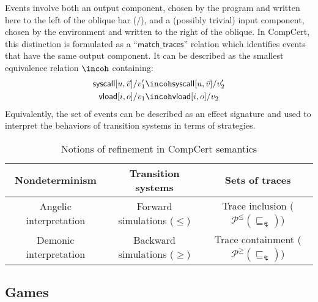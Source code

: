 \documentclass[sigplan,10pt,review,anonymous]{acmart}
\newcommand{\kw}[1]{\ensuremath{ \mathsf{#1} }}
\newcommand{\refby}{\sqsubseteq}
\begin{document}
Events involve both an output component,
chosen by the program and
written here to the left of the oblique bar ($/$),
and a (possibly trivial) input component,
chosen by the environment and written to the right of the oblique.
In CompCert,
this distinction is formulated as a ``$\kw{match\_traces}$'' relation
which identifies events that have the same output component.
It can be described as the smallest equivalence relation $\incoh$
containing:
\begin{align*}
  \kw{syscall}[u, \vec{v}]/v_1' &\incoh
  \kw{syscall}[u, \vec{v}]/v_2'
  \\
  \kw{vload}[i, o]/v_1 &\incoh
  \kw{vload}[i, o]/v_2
\end{align*}
Equivalently,
the set of events can be described as an effect signature
and used to interpret the behaviors of transition systems
in terms of strategies.


\begin{table*} %
  \caption{Notions of refinement in CompCert semantics}
  \label{tbl:compcertref}
  \centering
  \begin{tabular}{ccc}
    \hline
    Nondeterminism
      & Transition systems
      & Sets of traces \\
    \hline
    Angelic interpretation
      & Forward simulations ($\le$)
      & Trace inclusion ($\mathcal{P}^\le(\refby_\lightning)$) \\
    Demonic interpretation
      & Backward simulations ($\ge$)
      & Trace containment ($\mathcal{P}^\ge(\refby_\lightning)$) \\
    \hline
  \end{tabular}
\end{table*}

\subsection{Games} \label{sec:sem:games} %
\end{document}
